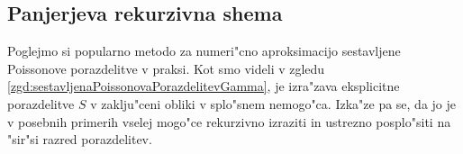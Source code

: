 \documentclass[12pt, a4paper, reqno]{amsart}
\theoremstyle{definition}
\theoremstyle{plain}
\newcommand{\1}{\mathds{1}}
\begin{document}
%
%





    \subsection{Panjerjeva rekurzivna shema}
    Poglejmo si popularno metodo za numeri"cno aproksimacijo sestavljene Poissonove porazdelitve v praksi. Kot
    smo videli v zgledu \ref{zgd:sestavljenaPoissonovaPorazdelitevGamma}, je izra"zava eksplicitne 
    porazdelitve $S$ v zaklju"ceni obliki v splo"snem nemogo"ca. Izka"ze pa se, da jo je v posebnih primerih vselej mogo"ce
    rekurzivno izraziti in ustrezno posplo"siti na "sir"si razred porazdelitev. 
\end{document}
